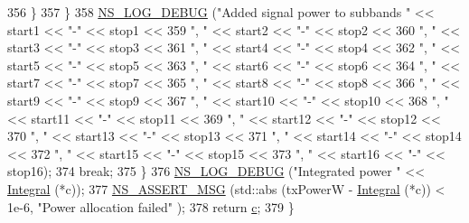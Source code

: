 \begin{DoxyCode}
356             \}
357         \}
358       \hyperlink{group__logging_ga413f1886406d49f59a6a0a89b77b4d0a}{NS\_LOG\_DEBUG} (\textcolor{stringliteral}{"Added signal power to subbands "} << start1 << \textcolor{stringliteral}{"-"} << stop1 <<
359                     \textcolor{stringliteral}{", "} << start2 << \textcolor{stringliteral}{"-"} << stop2 <<
360                     \textcolor{stringliteral}{", "} << start3 << \textcolor{stringliteral}{"-"} << stop3 <<
361                     \textcolor{stringliteral}{", "} << start4 << \textcolor{stringliteral}{"-"} << stop4 <<
362                     \textcolor{stringliteral}{", "} << start5 << \textcolor{stringliteral}{"-"} << stop5 <<
363                     \textcolor{stringliteral}{", "} << start6 << \textcolor{stringliteral}{"-"} << stop6 <<
364                     \textcolor{stringliteral}{", "} << start7 << \textcolor{stringliteral}{"-"} << stop7 <<
365                     \textcolor{stringliteral}{", "} << start8 << \textcolor{stringliteral}{"-"} << stop8 <<
366                     \textcolor{stringliteral}{", "} << start9 << \textcolor{stringliteral}{"-"} << stop9 <<
367                     \textcolor{stringliteral}{", "} << start10 << \textcolor{stringliteral}{"-"} << stop10 <<
368                     \textcolor{stringliteral}{", "} << start11 << \textcolor{stringliteral}{"-"} << stop11 <<
369                     \textcolor{stringliteral}{", "} << start12 << \textcolor{stringliteral}{"-"} << stop12 <<
370                     \textcolor{stringliteral}{", "} << start13 << \textcolor{stringliteral}{"-"} << stop13 <<
371                     \textcolor{stringliteral}{", "} << start14 << \textcolor{stringliteral}{"-"} << stop14 <<
372                     \textcolor{stringliteral}{", "} << start15 << \textcolor{stringliteral}{"-"} << stop15 <<
373                     \textcolor{stringliteral}{", "} << start16 << \textcolor{stringliteral}{"-"} << stop16);
374       \textcolor{keywordflow}{break};
375     \}
376   \hyperlink{group__logging_ga413f1886406d49f59a6a0a89b77b4d0a}{NS\_LOG\_DEBUG} (\textcolor{stringliteral}{"Integrated power "} << \hyperlink{namespacens3_a3dd3817567502f8bc77b04e47134c070}{Integral} (*c));
377   \hyperlink{assert_8h_aff5ece9066c74e681e74999856f08539}{NS\_ASSERT\_MSG} (std::abs (txPowerW - \hyperlink{namespacens3_a3dd3817567502f8bc77b04e47134c070}{Integral} (*c)) < 1e-6, \textcolor{stringliteral}{"Power allocation failed"}
      );
378   \textcolor{keywordflow}{return} \hyperlink{lte_2model_2fading-traces_2fading__trace__generator_8m_ae0323a9039add2978bf5b49550572c7c}{c};
379 \}
\end{DoxyCode}


